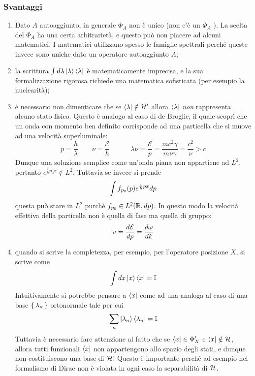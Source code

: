 \documentclass[../../FisicaTeorica.tex]{subfiles}
\begin{document}
\subsubsection{Svantaggi}
\begin{enumerate}
\item Dato $A$ autoaggiunto, in generale $\Phi_A$ non è unico (non c'è un $\Phi_A$ ). La scelta del $\Phi_A$ ha una certa arbitrarietà, e questo può non piacere ad alcuni matematici. I matematici utilizzano spesso le famiglie spettrali perché queste invece sono uniche dato un operatore autoaggiunto $A$;

\item la scrittura $\int d \lambda \ket\lambda\bra\lambda$ è matematicamente imprecisa, e la sua formalizzazione rigorosa richiede una matematica sofisticata (per esempio la nuclearità);

\item è necessario non dimenticare che se $\bra\lambda \notin \mathcal{H}'$ allora $\bra\lambda$ \emph{non} rappresenta alcuno stato fisico. Questo è analogo al caso di de Broglie, il quale scoprì che un onda con momento ben definito corrisponde ad una particella che si muove ad una velocità superluminale:
\[
p = \frac{h}{\lambda} \qquad \nu = \frac{\mathcal E}{h}
\qquad \quad
\lambda \nu = \frac{\mathcal E}{p} = \frac{m c^2 \gamma}{m \nu \gamma} = \frac{c^2}{\nu} > c
\]
Dunque una soluzione semplice come un'onda piana non appartiene ad $L^2$, pertanto $e^{\frac{i}{\hbar}p_0 x} \notin L^2$. Tuttavia se invece si prende
\[
\int f_{p_0}(p) e^{\frac{i}{\hbar} p x} d p
\]
questa può stare in $L^2$ purchè $f_{p_0} \in L^2(\mathbb R, d p)$. In questo modo la velocità effettiva della particella non è quella di fase ma quella di gruppo:
\[
v = \frac{d \mathcal E}{d p} = \frac{d \omega}{d k}
\]

\item quando si scrive la completezza, per esempio, per l'operatore posizione $X$, si scrive come
\[
\int d x \ket x \bra x = \mathbb I
\]
Intuitivamente si potrebbe pensare a $\bra x$ come ad una  analoga al caso di una base $\set{\lambda_n}$ ortonormale tale per cui
\[
\sum_n \ket{\lambda_n} \bra{\lambda_n} = \mathbb I
\]
Tuttavia è necessario fare attenzione al fatto che se $\bra x \in \Phi'_X$ e $\bra x \notin \mathcal{H}$, allora tutti funzionali $\bra x$ non appartengono allo spazio degli stati, e dunque non costituiscono una base di $\mathcal{H}$! Questo è importante perché ad esempio nel formalismo di Dirac non è violata in ogni caso la separabilità di $\mathcal{H}$.
\end{enumerate}
\end{document}
